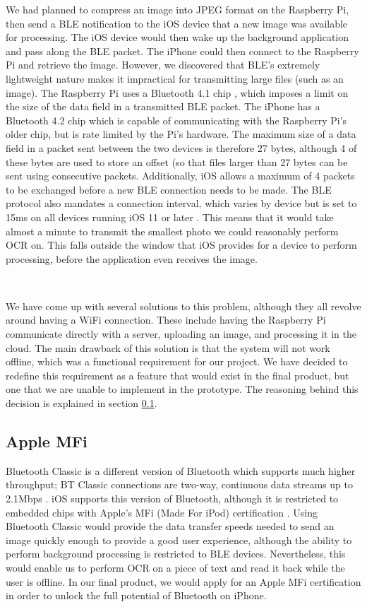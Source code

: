 \documentclass[a4paper,11pt]{article}
\begin{document}
\noindent
We had planned to compress an image into JPEG format on the Raspberry Pi, then send a BLE notification to the iOS device that a new image was available for processing. The iOS device would then wake up the background application and pass along the BLE packet. The iPhone could then connect to the Raspberry Pi and retrieve the image. However, we discovered that BLE's extremely lightweight nature makes it impractical for transmitting large files (such as an image). The Raspberry Pi uses a Bluetooth 4.1 chip \cite{raspi-hardware}, which imposes a limit on the size of the data field in a transmitted BLE packet. The iPhone has a Bluetooth 4.2 chip \cite{iphone-hardware} which is capable of communicating with the Raspberry Pi's older chip, but is rate limited by the Pi's hardware. The maximum size of a data field in a packet sent between the two devices is therefore 27 bytes, although 4 of these bytes are used to store an offset (so that files larger than 27 bytes can be sent using consecutive packets. Additionally, iOS allows a maximum of 4 packets to be exchanged before a new BLE connection needs to be made. The BLE protocol also mandates a connection interval, which varies by device but is set to 15ms on all devices running iOS 11 or later \cite{apple-bluetooth}. This means that it would take almost a minute to transmit the smallest photo we could reasonably perform OCR on. This falls outside the window that iOS provides for a device to perform processing, before the application even receives the image.

\

\noindent
We have come up with several solutions to this problem, although they all revolve around having a WiFi connection. These include having the Raspberry Pi communicate directly with a server, uploading an image, and processing it in the cloud. The main drawback of this solution is that the system will not work offline, which was a functional requirement for our project. We have decided to redefine this requirement as a feature that would exist in the final product, but one that we are unable to implement in the prototype. The reasoning behind this decision is explained in section \ref{apple-mfi}.

\subsection{Apple MFi}
\label{apple-mfi}
Bluetooth Classic is a different version of Bluetooth which supports much higher throughput; BT Classic connections are two-way, continuous data streams up to 2.1Mbps \cite{bluetooth-classic}. iOS supports this version of Bluetooth, although it is restricted to embedded chips with Apple's MFi (Made For iPod) certification \cite{apple-mfi}. Using Bluetooth Classic would provide the data transfer speeds needed to send an image quickly enough to provide a good user experience, although the ability to perform background processing is restricted to BLE devices. Nevertheless, this would enable us to perform OCR on a piece of text and read it back while the user is offline. In our final product, we would apply for an Apple MFi certification in order to unlock the full potential of Bluetooth on iPhone.
\end{document}
